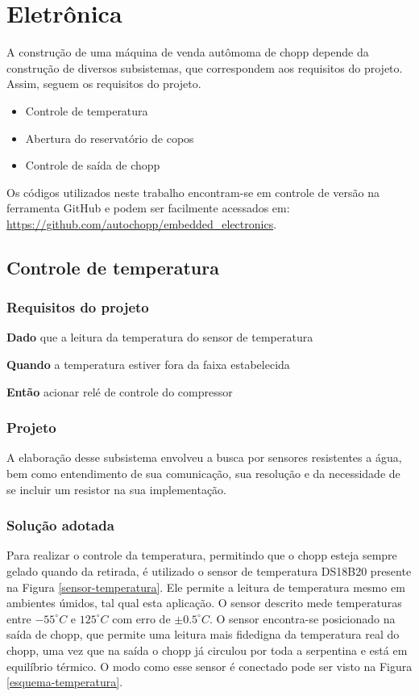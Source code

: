 \chapter[Eletrônica]{Eletrônica}


 
 A construção de uma máquina de venda autômoma de chopp depende da construção de diversos subsistemas,
 que correspondem aos requisitos do projeto. Assim, seguem os requisitos do projeto.

\begin{itemize}
\item Controle de temperatura
\item Abertura do reservatório de copos
\item Controle de saída de chopp
\end{itemize}
  
Os códigos utilizados neste trabalho encontram-se em controle de versão na ferramenta GitHub 
e podem ser facilmente acessados em: \url{https://github.com/autochopp/embedded_electronics}. 


\section{Controle de temperatura}
\subsection{Requisitos do projeto}

\textbf{Dado} que a leitura da temperatura do sensor de temperatura

\textbf{Quando} a temperatura estiver fora da faixa estabelecida

\textbf{Então} acionar  relé de controle do compressor

\subsection{Projeto}
 
 A elaboração desse subsistema envolveu a busca por sensores resistentes a água, bem como entendimento 
 de sua comunicação, sua resolução e da necessidade de se incluir um resistor na sua implementação.

\subsection{Solução adotada}

Para realizar o controle da temperatura, permitindo que o chopp esteja sempre gelado quando da retirada, 
é utilizado o sensor de temperatura DS18B20 presente na Figura \ref{sensor-temperatura}. 
Ele  permite a leitura de temperatura  mesmo em ambientes úmidos, tal qual esta aplicação. 
O sensor descrito mede temperaturas entre   $ -55 ^\circ C$ e $125 ^\circ C$ com erro de $\pm 0.5 ^\circ C$.
O sensor encontra-se posicionado na saída de chopp, que permite uma leitura mais fidedigna da
temperatura real do chopp, uma vez que  na saída o chopp já circulou por toda a serpentina e está em
equilíbrio térmico. O modo como esse sensor é conectado pode ser visto na Figura \ref{esquema-temperatura}.

